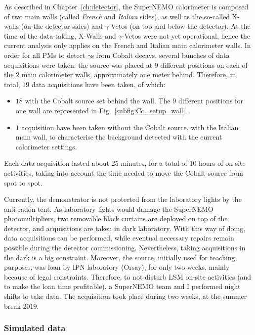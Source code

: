 As described in Chapter~\ref{ch:detector}, the SuperNEMO calorimeter is composed of two main walls (called \emph{French} and \emph{Italian} sides), as well as the so-called X-walls (on the detector sides) and $\gamma$-Vetos (on top and below the detector).
At the time of the data-taking, X-Walls and $\gamma$-Vetos were not yet operational, hence the current analysis only applies on the French and Italian main calorimeter walls.
In order for all PMs to detect $\gamma$s from Cobalt decays, several bunches of data acquisitions were taken:
the source was placed at $9$ different positions on each of the $2$ main calorimeter walls, approximately one meter behind.
Therefore, in total, $19$ data acquisitions have been taken, of which:
\begin{itemize}
\item $18$ with the Cobalt source set behind the wall. The $9$ different positions for one wall are represented in Fig.~\ref{subfig:Co_setup_wall}.
\item $1$ acquisition have been taken without the Cobalt source, with the Italian main wall, to characterise the background detected with the current calorimeter settings.
\end{itemize}
Each data acquisition lasted about $25$ minutes, for a total of $10$ hours of on-site activities, taking into account the time needed to move the Cobalt source from spot to spot.

Currently, the demonstrator is not protected from the laboratory lights by the anti-radon tent.
As laboratory lights would damage the SuperNEMO photomultipliers, two removable black curtains are deployed on top of the detector, and acquisitions are taken in dark laboratory.
With this way of doing, data acquisitions can be performed, while eventual necessary repairs remain possible during the detector commissioning.
Nevertheless, taking acquisitions in the dark is a big constraint.
Moreover, the source, initially used for teaching purposes, was loan by IPN laboratory (Orsay), for only two weeks, mainly because of legal constraints.
Therefore, to not disturb LSM on-site activities (and to make the loan time profitable), a SuperNEMO team and I performed night shifts to take data.
The acquisition took place during two weeks, at the summer break $2019$.

\subsubsection*{Simulated data}

